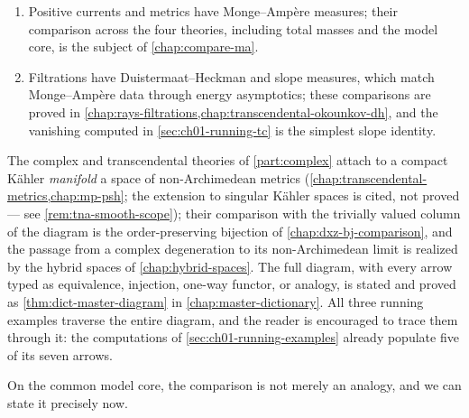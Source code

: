 \begin{enumerate}
\item[(F)] Positive currents and metrics have Monge--Amp\`ere measures;
their comparison across the four theories, including total masses and the
model core, is the subject of \cref{chap:compare-ma}.

\item[(G)] Filtrations have Duistermaat--Heckman and slope measures, which
match Monge--Amp\`ere data through energy asymptotics; these comparisons
are proved in \cref{chap:rays-filtrations,chap:transcendental-okounkov-dh},
and the vanishing computed in \cref{sec:ch01-running-tc} is the simplest
slope identity.
\end{enumerate}

The complex and transcendental theories of \cref{part:complex} attach to a
compact K\"ahler \emph{manifold} a space of non-Archimedean metrics
(\cref{chap:transcendental-metrics,chap:mp-psh}; the extension to singular
K\"ahler spaces is cited, not proved --- see \cref{rem:tna-smooth-scope});
their comparison with the
trivially valued column of the diagram is the order-preserving bijection of
\cref{chap:dxz-bj-comparison}, and the passage from a complex degeneration
to its non-Archimedean limit is realized by the hybrid spaces of
\cref{chap:hybrid-spaces}.  The full diagram, with every arrow typed as
equivalence, injection, one-way functor, or analogy, is stated and proved
as \cref{thm:dict-master-diagram} in \cref{chap:master-dictionary}.  All
three running examples traverse the entire diagram, and the reader is
encouraged to trace them through it: the computations of
\cref{sec:ch01-running-examples} already populate five of its seven arrows.

On the common model core, the comparison is not merely an analogy, and we
can state it precisely now.

